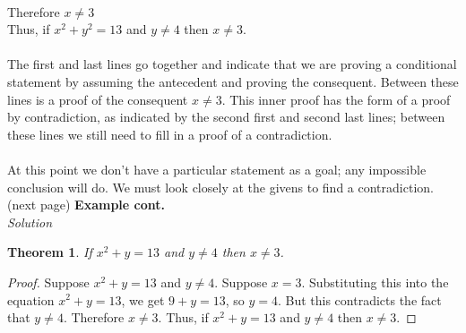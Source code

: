 \documentclass{report}
\newtheorem*{theorem}{Theorem}
\begin{document}
\indent\indent{}\\
\indent\indent Therefore $x\neq3$\\
\indent Thus, if $x^2+y^2=13$ and $y\neq4$ then $x\neq3$.\\
\vspace{1mm}\\
The first and last lines go together and indicate that we are proving a conditional statement by assuming the antecedent and proving the consequent. Between these lines is a proof of
the consequent $x\neq3$. This inner proof has the form of a proof by contradiction, as indicated by the second first and second last lines; between these lines we still need
to fill in a proof of a contradiction.\\
\vspace{1mm}\\
At this point we don't have a particular statement as a goal; any impossible conclusion will do. We must look closely at the givens to find a contradiction.\\ 
(next page)\newpage
\noindent\textbf{Example cont.}\\
\textit{Solution}
\begin{theorem}
If $x^2+y=13$ and $y\neq4$ then $x\neq3$.
\end{theorem}
\begin{proof}
Suppose $x^2+y=13$ and $y\neq4$. Suppose $x=3$. Substituting this into the equation $x^2+y=13$, we get $9+y=13$, so $y=4$. But this contradicts the fact that $y\neq4$. Therefore $x\neq 3$. 
Thus, if $x^2+y=13$ and $y\neq 4$ then $x\neq 3$.
\end{proof}
\end{document}
